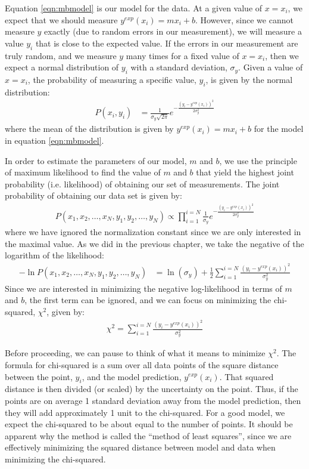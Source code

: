 Equation \ref{eqn:mbmodel} is our model for the data. At a given value of $x=x_i$, we expect that we should measure $y^{exp}(x_i)=mx_i+b$. However, since we cannot measure $y$ exactly (due to random errors in our measurement), we will measure a value $y_i$ that is close to the expected value. If the errors in our measurement are truly random, and we measure $y$ many times for a fixed value of $x=x_i$, then we expect a normal distribution of $y_i$ with a standard deviation, $\sigma_{y}$. Given a value of $x=x_i$, the probability of measuring a specific value, $y_i$, is given by the normal distribution:
\begin{align}
P(x_i,y_i)&=\frac{1}{\sigma_{y}\sqrt{2\pi}}e^{-\frac{(y_i-y^{exp}(x_i))^2}{2\sigma_{y}^2}}
\end{align}
where the mean of the distribution is given by $y^{exp}(x_i)=mx_i+b$ for the model in equation \ref{eqn:mbmodel}.

In order to estimate the parameters of our model, $m$ and $b$, we use the principle of maximum likelihood to find the value of $m$ and $b$ that yield the highest joint probability (i.e. likelihood) of obtaining our set of measurements. The joint probability of obtaining our data set is given by:
\begin{align*}
P(x_1,x_2,\dots,x_N,y_1,y_2,\dots,y_N)\propto\prod_{i=1}^{i=N}\frac{1}{\sigma_{y}}e^{-\frac{(y_i-y^{exp}(x_i))^2}{2\sigma_{y}^2}}
\end{align*}
where we have ignored the normalization constant since we are only interested in the maximal value. As we did in the previous chapter, we take the negative of the logarithm of the likelihood:
\begin{align}
-\ln{P(x_1,x_2,\dots,x_N,y_1,y_2,\dots,y_N)}&=\ln(\sigma_y)+\frac{1}{2}\sum_{i=1}^{i=N}\frac{(y_i-y^{exp}(x_i))^2}{\sigma_{y}^2}
\end{align}
Since we are interested in minimizing the negative log-likelihood in terms of $m$ and $b$, the first term can be ignored, and we can focus on minimizing the chi-squared, $\chi^2$, given by:
\begin{align}
\chi^2=\sum_{i=1}^{i=N}\frac{(y_i-y^{exp}(x_i))^2}{\sigma_{y}^2}
\end{align}

Before proceeding, we can pause to think of what it means to minimize $\chi^2$. The formula for chi-squared is a sum over all data points of the square distance between the point, $y_i$, and the model prediction, $y^{exp}(x_i)$. That squared distance is then divided (or scaled) by the uncertainty on the point. Thus, if the points are on average 1 standard deviation away from the model prediction, then they will add approximately 1 unit to the chi-squared. For a good model, we expect the chi-squared to be about equal to the number of points. It should be apparent why the method is called the ``method of least squares'', since we are effectively minimizing the squared distance between model and data when minimizing the chi-squared.


